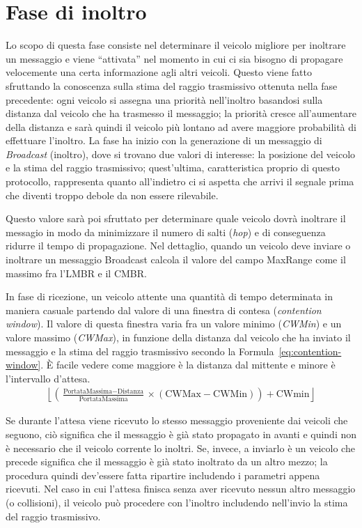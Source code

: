 \section{Fase di inoltro}\label{sec:fb-fase-inoltro}
Lo scopo di questa fase consiste nel determinare il veicolo migliore per inoltrare un messaggio
e viene ``attivata'' nel momento in cui ci sia bisogno di propagare velocemente una certa informazione
agli altri veicoli.
Questo viene fatto sfruttando la conoscenza sulla stima del raggio trasmissivo ottenuta nella fase precedente:
ogni veicolo si assegna una priorità nell'inoltro basandosi sulla distanza dal veicolo che ha trasmesso il messaggio;
la priorità cresce all'aumentare della distanza e sarà quindi il veicolo più lontano ad avere maggiore
probabilità di effettuare l'inoltro.
La fase ha inizio con la generazione di un messaggio di \textit{Broadcast} (inoltro),
dove si trovano due valori di interesse: la posizione del veicolo e la stima del raggio trasmissivo; quest'ultima, caratteristica proprio di questo protocollo,
rappresenta quanto all'indietro ci si aspetta che arrivi il segnale prima che diventi troppo debole da non essere rilevabile.

Questo valore sarà poi sfruttato per determinare quale veicolo dovrà inoltrare il messagio in modo da minimizzare il numero di salti (\textit{hop}) e di conseguenza
ridurre il tempo di propagazione.
Nel dettaglio, quando un veicolo deve inviare o inoltrare un messaggio Broadcast calcola il valore del campo MaxRange come il massimo fra l'LMBR e il CMBR.

In fase di ricezione, un veicolo attente una quantità di tempo determinata in maniera casuale partendo dal valore di una finestra di contesa (\textit{contention window}).
Il valore di questa finestra varia fra un valore minimo (\textit{CWMin}) e un valore massimo (\textit{CWMax}), in funzione della distanza dal veicolo che ha inviato il messaggio
e la stima del raggio trasmissivo secondo la Formula~\ref{eq:contention-window}.
È facile vedere come maggiore è la distanza dal mittente e minore è l'intervallo d'attesa.
\begin{gather}\label{eq:contention-window}
	\left\lfloor \left( \frac{\text{PortataMassima} - \text{Distanza}}{\text{PortataMassima}} \times (\text{CWMax} - \text{CWMin}) \right) + \text{CWmin}  \right\rfloor
\end{gather}

Se durante l'attesa viene ricevuto lo stesso messaggio proveniente dai veicoli che seguono, ciò significa che il messaggio è già stato propagato in avanti e quindi non è necessario
che il veicolo corrente lo inoltri.
Se, invece, a inviarlo è un veicolo che precede significa che il messaggio è già stato inoltrato da un altro mezzo; la procedura quindi dev'essere fatta ripartire includendo i parametri appena ricevuti.
Nel caso in cui l'attesa finisca senza aver ricevuto nessun altro messaggio (o collisioni), il veicolo può procedere con l'inoltro includendo nell'invio la stima del raggio trasmissivo.


